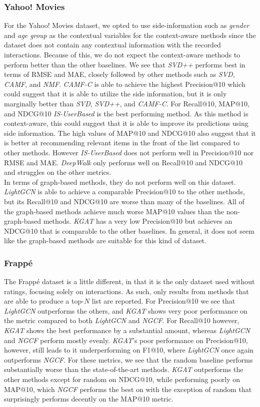 \subsubsection{Yahoo! Movies}
For the Yahoo! Movies dataset, we opted to use side-information such as \textit{gender} and \textit{age group} as the contextual variables for the context-aware methods since the dataset does not contain any contextual information with the recorded interactions.
Because of this, we do not expect the context-aware methods to perform better than the other baselines.
We see that \textit{SVD++} performs best in terms of RMSE and MAE, closely followed by other methods such as \textit{SVD}, \textit{CAMF}, and \textit{NMF}.
\textit{CAMF-C} is able to achieve the highest Precision@10 which could suggest that it is able to utilize the side information, but it is only marginally better than \textit{SVD}, \textit{SVD++}, and \textit{CAMF-C}.
For Recall@10, MAP@10, and NDCG@10 \textit{IS-UserBased} is the best performing method.
As this method is context-aware, this could suggest that it is able to improve its predictions using side information.
The high values of MAP@10 and NDCG@10 also suggest that it is better at recommending relevant items in the front of the list compared to other methods.
However \textit{IS-UserBased} does not perform well in Precision@10 nor RMSE and MAE.
\textit{DeepWalk} only performs well on Recall@10 and NDCG@10 and struggles on the other metrics.
\\
In terms of graph-based methods, they do not perform well on this dataset.
\textit{LightGCN} is able to achieve a comparable Precision@10 to the other methods, but its Recall@10 and NDCG@10 are worse than many of the baselines.
All of the graph-based methods achieve much worse MAP@10 values than the non-graph-based methods.
\textit{KGAT} has a very low Precision@10 but achieves an NDCG@10 that is comparable to the other baselines.
In general, it does not seem like the graph-based methods are suitable for this kind of dataset.

\subsubsection{Frappé}
The Frappé dataset is a little different, in that it is the only dataset used without ratings, focusing solely on interactions.
As such, only results from methods that are able to produce a top-$N$ list are reported.
For Precision@10 we see that \textit{LightGCN} outperforms the others, and \textit{KGAT} shows very poor performance on the metric compared to both \textit{LightGCN} and \textit{NGCF}.
For Recall@10 however, \textit{KGAT} shows the best performance by a substantial amount, whereas \textit{LightGCN} and \textit{NGCF} perform mostly evenly.
\textit{KGAT}'s poor performance on Precision@10, however, still leads to it underperforming on F1@10, where \textit{LightGCN} once again outperforms \textit{NGCF}.
For these metrics, we see that the random baseline performs substantially worse than the state-of-the-art methods.
\textit{KGAT} outperforms the other methods except for random on NDCG@10, while performing poorly on MAP@10, which \textit{NGCF} performs the best on with the exception of random that surprisingly performs decently on the MAP@10 metric.
